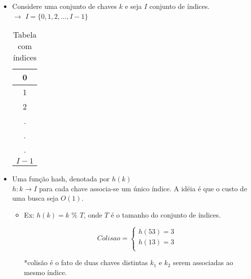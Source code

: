 \documentclass[a4paper, 12pt]{article}
\begin{document}
\begin{itemize}
\item Considere uma conjunto de chaves $k$ e seja $I$ conjunto de índices.\\
$\rightarrow$ $I = \{0, 1, 2, ... , I-1\}$\\


\begin{table}[h]
\centering
\caption{Tabela com índices}
\begin{tabular}{|c|}
 \hline 
 0\\ 
 \hline
 1\\
 \hline
 2\\
 \hline
 .\\ 
 \hline
 .\\ 
 \hline
 .\\ 
 \hline
 $I-1$\\ 
 \hline
\end{tabular}
\end{table}

\item Uma função hash, denotada por $h(k)$\\
$h: k \rightarrow I$ para cada chave associa-se um único índice. A idéia é que o custo de uma busca seja $O(1)$.
\begin{itemize}
\item Ex: $h(k) = k$ $\%$ $T$, onde $T$ é o tamanho do conjunto de índices.

\begin{equation}
  {Colisao} =
    \begin{cases}
      {h(53)} = 3\\
      {h(13)} = 3\\
    \end{cases}       
\end{equation}

*colisão é o fato de duas chaves distintas $k_{1}$ e $k_{2}$ serem associadas ao mesmo índice.
\end{itemize}


\end{itemize}
\end{document}
